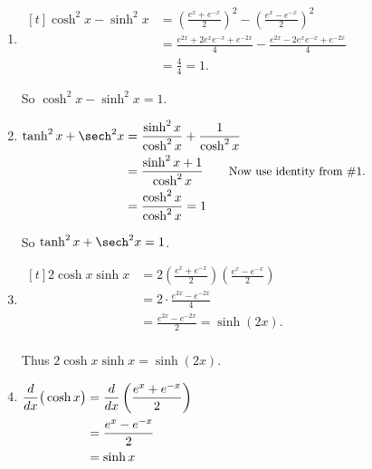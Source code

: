 {\begin{enumerate}
\item		%
\hfill$\begin{aligned}[t]
 \cosh^2x-\sinh^2x &= \left(\frac{e^x+e^{-x}}2\right)^2 -\left(\frac{e^x-e^{-x}}2\right)^2\\
 						&= \frac{e^{2x}+2e^xe^{-x} + e^{-2x}}4 - \frac{e^{2x}-2e^xe^{-x} + e^{-2x}}4\\
 						&= \frac44=1.
\end{aligned}$\hfill

So $\cosh^2 x-\sinh^2x=1$.

\item		\hfill$\begin{aligned}[t]
\tanh^2 x+\sech^2 x &=\frac{\sinh^2x}{\cosh^2 x} + \frac{1}{\cosh^2 x} \\
					&= \frac{\sinh^2x+1}{\cosh^2 x}\qquad \text{\small Now use identity from \#1.}\\
					&= \frac{\cosh^2 x}{\cosh^2 x} = 1
\end{aligned}$\hfill



So $\tanh^2 x+\sech^2 x=1$.

\drawexampleline

\item \hfill$\begin{aligned}[t]
	2\cosh x\sinh x &= 2\left(\frac{e^x+e^{-x}}2\right)\left(\frac{e^x-e^{-x}}2\right) \\
					&= 2 \cdot\frac{e^{2x} - e^{-2x}}4\\
					&= \frac{e^{2x} - e^{-2x}}2 = \sinh (2x).\\
			\end{aligned}$ \hfill
			
Thus $2\cosh x\sinh x = \sinh (2x)$.

\item  \hfill$\begin{aligned}[t]
	\frac{d}{dx}\big(\cosh x\big) &= \frac{d}{dx}\left(\frac{e^x+e^{-x}}2\right) \\
					&= \frac{e^x-e^{-x}}2\\
					&= \sinh x
	\end{aligned}\hfill$


\end{enumerate}}
